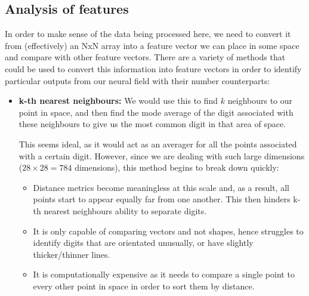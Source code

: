 \documentclass[10pt]{article}
\begin{document}
\begin{flushleft}
    \subsection{Analysis of features}

    In order to make sense of the data being processed here, we need to convert it from (effectively) an NxN array into
    a feature vector we can place in some space and compare with other feature vectors.
    There are a variety of methods that could be used to convert this information into feature vectors in order to identify
    particular outputs from our neural field with their number counterparts:

    \begin{itemize}
        \item \textbf{k-th nearest neighbours:}
        We would use this to find $k$ neighbours to our point in space, and then find the mode average of the digit associated
        with these neighbours to give us the most common digit in that area of space.
        
        This seems ideal, as it would act as an averager for all the points associated with a certain
        digit.
        However, since we are dealing with such large dimensions ($28\times28=784$ dimensions),
        this method begins to break down quickly:

        \begin{itemize}
            \item Distance metrics become meaningless at this scale and, as a result, all points start to appear equally far
            from one another.
            This then hinders k-th nearest neighbours ability to separate digits.
            \item It is only capable of comparing vectors and not shapes, hence struggles to identify digits that are
            orientated unusually, or have slightly thicker/thinner lines.
            \item It is computationally expensive as it needs to compare a single point to every other point in space in order to sort them by distance.
        \end{itemize}


\end{itemize}
\end{flushleft}
\end{document}
